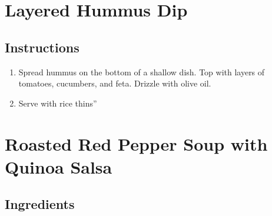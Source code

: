 \documentclass[letterpaper,10pt,english]{sphinxmanual}
\begin{document}
\chapter{Layered Hummus Dip}
\label{\detokenize{layered_hd:layered-hummus-dip}}\label{\detokenize{layered_hd::doc}}
%
\begin{sphinxVerbatim}[commandchars=\\\{\}]
  

       

   

   

   
\end{sphinxVerbatim}


\section{Instructions}
\label{\detokenize{layered_hd:instructions}}\begin{enumerate}
\item {} 
Spread hummus on the bottom of a shallow dish. Top with layers of tomatoes, cucumbers, and feta. Drizzle with olive oil.

\item {} 
Serve with rice thins”

\end{enumerate}


\chapter{Roasted Red Pepper Soup with Quinoa Salsa}
\label{\detokenize{RRPS_Quinoa_Salsa:roasted-red-pepper-soup-with-quinoa-salsa}}\label{\detokenize{RRPS_Quinoa_Salsa::doc}}

\section{Ingredients}
\label{\detokenize{RRPS_Quinoa_Salsa:ingredients}}
%
\begin{sphinxVerbatim}[commandchars=\\\{\}]
       
\end{sphinxVerbatim}
\end{document}
